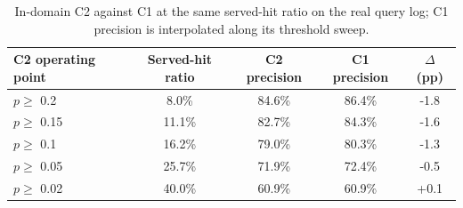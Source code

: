 \begin{table}[htbp]
\centering
\caption{In-domain C2 against C1 at the same served-hit ratio on the real query log; C1 precision is interpolated along its threshold sweep.}
\label{tab:searchqueries_matched}
\footnotesize
\begin{tabular}{lcccc}
\toprule
C2 operating point & Served-hit ratio & C2 precision & C1 precision & $\Delta$ (pp) \\
\midrule
$p \geq$ 0.2 & 8.0\% & 84.6\% & 86.4\% & -1.8 \\
$p \geq$ 0.15 & 11.1\% & 82.7\% & 84.3\% & -1.6 \\
$p \geq$ 0.1 & 16.2\% & 79.0\% & 80.3\% & -1.3 \\
$p \geq$ 0.05 & 25.7\% & 71.9\% & 72.4\% & -0.5 \\
$p \geq$ 0.02 & 40.0\% & 60.9\% & 60.9\% & +0.1 \\
\bottomrule
\end{tabular}
\end{table}

